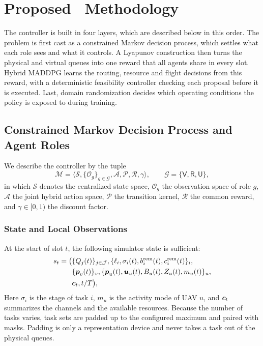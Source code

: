 \section{Proposed \method\ Methodology}
The controller is built in four layers, which are described below in this
order. The problem is first cast as a constrained Markov decision process,
which settles what each role sees and what it controls. A Lyapunov
construction then turns the physical and virtual queues into one reward that
all agents share in every slot. Hybrid MADDPG learns the routing, resource
and flight decisions from this reward, with a deterministic feasibility
controller checking each proposal before it is executed. Last, domain
randomization decides which operating conditions the policy is exposed to
during training.

\subsection{Constrained Markov Decision Process and Agent Roles}
We describe the controller by the tuple
\begin{equation}
\mathcal M=\langle\mathcal S,\{\mathcal O_g\}_{g\in\mathcal G},
\mathcal A,\mathcal P,\mathcal R,\gamma\rangle,
\qquad \mathcal G=\{\mathsf V,\mathsf R,\mathsf U\},
\label{eq:cmdp}
\end{equation}
in which $\mathcal S$ denotes the centralized state space, $\mathcal O_g$ the
observation space of role $g$, $\mathcal A$ the joint hybrid action space,
$\mathcal P$ the transition kernel, $\mathcal R$ the common reward, and
$\gamma\in[0,1)$ the discount factor.

\subsubsection{State and Local Observations}
At the start of slot $t$, the following simulator state is sufficient:
\begin{align}
s_t=\big(&\{Q_j(t)\}_{j\in\mathcal J},
\{\ell_i,\sigma_i(t),b_i^{\rm rem}(t),
c_i^{\rm rem}(t)\}_i,\nonumber\\
&\{\boldsymbol{p}_v(t)\}_v,
\{\boldsymbol{p}_u(t),\boldsymbol{u}_u(t),B_u(t),Z_u(t),m_u(t)\}_u,\nonumber\\
&
\boldsymbol{c}_t,t/T\big),
\label{eq:method_state}
\end{align}
Here $\sigma_i$ is the stage of task $i$, $m_u$ is the activity mode of UAV
$u$, and $\boldsymbol{c}_t$ summarizes the channels and the available resources.
Because the number of tasks varies, task sets are padded up to the configured
maximum and paired with masks. Padding is only a representation device and
never takes a task out of the physical queues.

